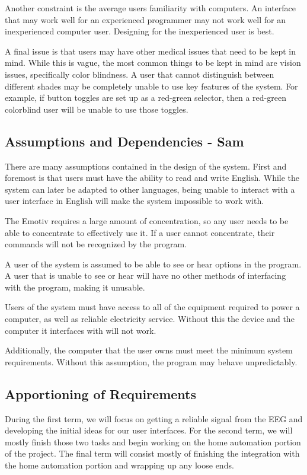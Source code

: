 \documentclass{article}
\begin{document}
Another constraint is the average users familiarity with computers. An
interface that may work well for an experienced programmer may not work well
for an inexperienced computer user. Designing for the inexperienced user is
best.

A final issue is that users may have other medical issues that need to be
kept in mind. While this is vague, the most common things to be kept in mind
are vision issues, specifically color blindness. A user that cannot
distinguish between different shades may be completely unable to use key
features of the system. For example, if button toggles are set up as a
red-green selector, then a red-green colorblind user will be unable to use
those toggles.

\subsection{Assumptions and Dependencies - Sam}
There are many assumptions contained in the design of the system. First and
foremost is that users must have the ability to read and write English.
While the system can later be adapted to other languages, being unable to
interact with a user interface in English will make the system impossible to
work with.

The Emotiv requires a large amount of concentration, so any user needs to be
able to concentrate to effectively use it. If a user cannot concentrate,
their commands will not be recognized by the program.

A user of the system is assumed to be able to see or hear options in the
program. A user that is unable to see or hear will have no other methods of
interfacing with the program, making it unusable.

Users of the system must have access to all of the equipment required to
power a computer, as well as reliable electricity service. Without this the
device and the computer it interfaces with will not work.

Additionally, the computer that the user owns must meet the minimum system
requirements. Without this assumption, the program may behave unpredictably.

\subsection{Apportioning of Requirements}
During the first term, we will focus on getting a reliable signal from the EEG and developing the initial ideas for our user interfaces. For the second term, we will mostly finish those two tasks and begin working on the home automation portion of the project. The final term will consist mostly of finishing the integration with the home automation portion and wrapping up any loose ends.
\newpage
\end{document}
